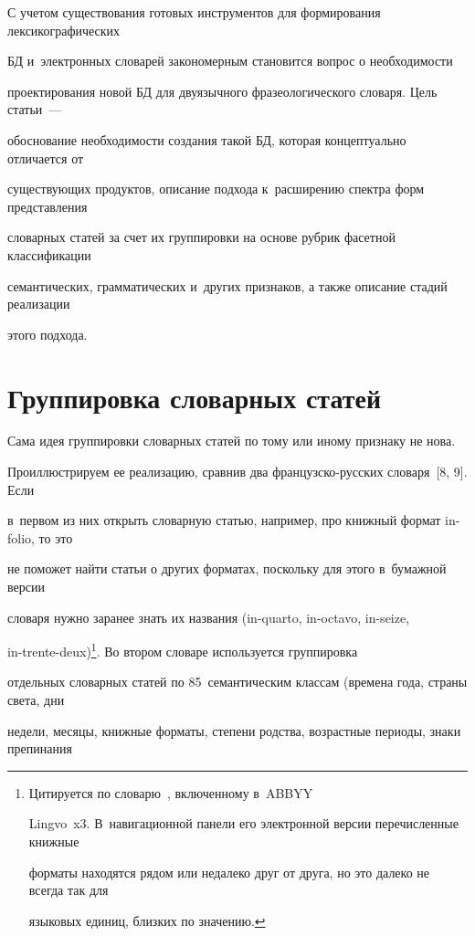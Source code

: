   С учетом существования готовых инструментов для формирования лексикографических 

БД и~электронных словарей закономерным становится вопрос о необходимости 

проектирования новой БД для двуязычного фразеологического словаря. Цель статьи~--- 

обоснование необходимости создания такой БД, которая концептуально отличается от 

существующих продуктов, описание подхода к~расширению спектра форм представления 

словарных статей за счет их группировки на основе рубрик фасетной классификации 

семантических, грамматических и~других признаков, а также описание стадий реализации 

этого подхода.



\section{Группировка словарных статей}



  Сама идея группировки словарных статей по тому или иному признаку не нова. 

Проиллюстрируем ее реализацию, сравнив два французско-русских словаря~[8, 9]. Если 

в~первом из них открыть словарную статью, например, про книжный формат in-folio, то это 

не поможет найти статьи о других форматах, поскольку для этого в~бумажной версии 

словаря нужно заранее знать их названия (in-quarto, in-octavo, in-seize,  

in-trente-deux)\footnote{Цитируется по словарю~\cite{8-vz}, включенному в~ABBYY 

Lingvo~x3. В~навигационной панели его электронной версии перечисленные книжные 

форматы находятся рядом или недалеко друг от друга, но это далеко не всегда так для 

языковых единиц, близких по значению.}. Во втором словаре используется группировка 

отдельных словарных статей по 85~семантическим классам (времена года, страны света, дни 

недели, месяцы, книжные форматы, степени родства, возрастные периоды, знаки препинания 

